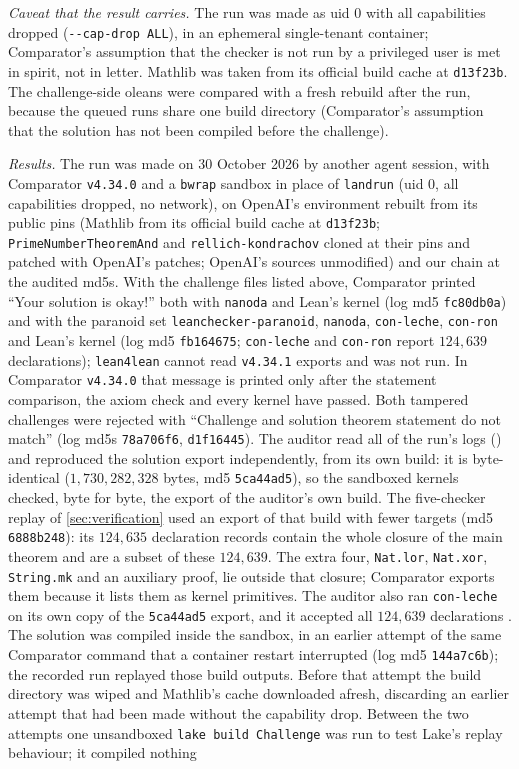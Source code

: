 \documentclass[11pt]{article}
\theoremstyle{definition}
\newcommand{\lean}[1]{\texttt{#1}}
\begin{document}
\medskip\noindent
\emph{Caveat that the result carries.} The run was made as uid 0 with all capabilities dropped (\lean{-{}-cap-drop ALL}), in an ephemeral single-tenant container; Comparator's assumption that the checker is not run by a privileged user is met in spirit, not in letter. Mathlib was taken from its official build cache at \lean{d13f23b}. The challenge-side oleans were compared with a fresh rebuild after the run, because the queued runs share one build directory (Comparator's assumption that the solution has not been compiled before the challenge).

\medskip\noindent
\emph{Results.} The run was made on 30 October 2026 by another agent session, with Comparator \lean{v4.34.0} and a \lean{bwrap} sandbox in place of \lean{landrun} (uid 0, all capabilities dropped, no network), on OpenAI's environment rebuilt from its public pins (Mathlib from its official build cache at \lean{d13f23b}; \lean{PrimeNumberTheoremAnd} and \lean{rellich-kondrachov} cloned at their pins and patched with OpenAI's patches; OpenAI's sources unmodified) and our chain at the audited md5s. With the challenge files listed above, Comparator printed ``Your solution is okay!'' both with \lean{nanoda} and Lean's kernel (log md5 \lean{fc80db0a}) and with the paranoid set \lean{leanchecker-paranoid}, \lean{nanoda}, \lean{con-leche}, \lean{con-ron} and Lean's kernel (log md5 \lean{fb164675}; \lean{con-leche} and \lean{con-ron} report $124{,}639$ declarations); \lean{lean4lean} cannot read \lean{v4.34.1} exports and was not run. In Comparator \lean{v4.34.0} that message is printed only after the statement comparison, the axiom check and every kernel have passed. Both tampered challenges were rejected with ``Challenge and solution theorem statement do not match'' (log md5s \lean{78a706f6}, \lean{d1f16445}). The auditor read all of the run's logs (\cite[REVIEW\_COMPARATOR\_LAMBDA\_CHI, Addendum~1]{bbrecords}) and reproduced the solution export independently, from its own build: it is byte-identical ($1{,}730{,}282{,}328$ bytes, md5 \lean{5ca44ad5}), so the sandboxed kernels checked, byte for byte, the export of the auditor's own build. The five-checker replay of \cref{sec:verification} used an export of that build with fewer targets (md5 \lean{6888b248}): its $124{,}635$ declaration records contain the whole closure of the main theorem and are a subset of these $124{,}639$. The extra four, \lean{Nat.lor}, \lean{Nat.xor}, \lean{String.mk} and an auxiliary proof, lie outside that closure; Comparator exports them because it lists them as kernel primitives. The auditor also ran \lean{con-leche} on its own copy of the \lean{5ca44ad5} export, and it accepted all $124{,}639$ declarations \cite[REVIEW\_COMPARATOR\_LAMBDA\_CHI, Addendum~2]{bbrecords}. The solution was compiled inside the sandbox, in an earlier attempt of the same Comparator command that a container restart interrupted (log md5 \lean{144a7c6b}); the recorded run replayed those build outputs. Before that attempt the build directory was wiped and Mathlib's cache downloaded afresh, discarding an earlier attempt that had been made without the capability drop. Between the two attempts one unsandboxed \lean{lake build Challenge} was run to test Lake's replay behaviour; it compiled nothing 
\end{document}
